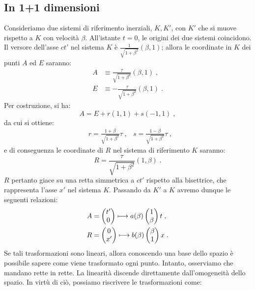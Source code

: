 \subsection{In 1+1 dimensioni}
Consideriamo due sistemi di riferimento inerziali, $K, K'$, con $K'$ che si muove rispetto a $K$ con velocità $\beta$. All'istante $t=0$,
 le origini dei due sistemi coincidono. Il versore dell'asse $ct'$ nel sistema $K$ è $\frac{1}{\sqrt{1+\beta^2}}(\beta,1)$; allora le 
coordinate in $K$ dei punti $A$ ed $E$ saranno:
\begin{align}
A &\equiv \frac{\tau}{\sqrt{1+\beta^2}}(\beta,1)\;, \\
E &\equiv -\frac{\tau}{\sqrt{1+\beta^2}}(\beta,1)\;.
\end{align}
Per costruzione, si ha:
$$
A=E+r(1,1)+s(-1,1)\;,
$$
da cui si ottiene:
\begin{align}
& r=\frac{1+\beta}{\sqrt{1+\beta^2}}\tau\;, & s=\frac{1-\beta}{\sqrt{1+\beta^2}}\tau\;,
\end{align}
e di conseguenza le coordinate di $R$ nel sistema di riferimento $K$ saranno:
\begin{equation}
R=\frac{\tau}{\sqrt{1+\beta^2}}(1,\beta)\;.
\end{equation}
$R$ pertanto giace su una retta simmetrica a $ct'$ rispetto alla bisettrice, che rappresenta l'asse $x'$ nel sistema $K$. Passando da 
$K'$ a $K$ avremo dunque le seguenti relazioni:
\begin{align}
A &= \begin{pmatrix}
t' \\
0
\end{pmatrix}\longmapsto a(\beta)\begin{pmatrix}
1 \\
\beta
\end{pmatrix}t\;, \notag \\
R &= \begin{pmatrix}
0 \\
x'
\end{pmatrix}\longmapsto b(\beta)\begin{pmatrix}
\beta \\
1
\end{pmatrix}x\;.
\end{align}
Se tali trasformazioni sono lineari, allora conoscendo una base dello spazio è possibile sapere come viene trasformato ogni punto. 
Intanto, osserviamo che mandano rette in rette. La linearità discende direttamente dall'omogeneità dello spazio. In virtù di ciò, 
possiamo riscrivere le trasformazioni come:
